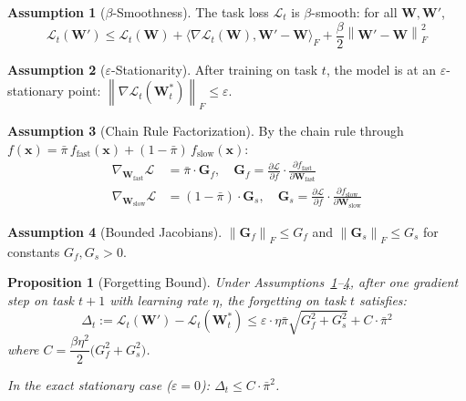 \documentclass[11pt,a4paper]{article}
\theoremstyle{plain}
\newtheorem{proposition}{Proposition}
\theoremstyle{definition}
\newtheorem{assumption}{Assumption}
\theoremstyle{remark}
\newcommand{\norm}[1]{\left\lVert #1 \right\rVert}
\newcommand{\inner}[2]{\langle #1, #2 \rangle}
\newcommand{\pibar}{\bar{\pi}}
\begin{document}
\begin{assumption}[$\beta$-Smoothness]
\label{ass:smooth}
The task loss $\mathcal{L}_t$ is $\beta$-smooth: for all $\mathbf{W}, \mathbf{W}'$,
\[
  \mathcal{L}_t(\mathbf{W}') \leq \mathcal{L}_t(\mathbf{W}) + \inner{\nabla\mathcal{L}_t(\mathbf{W})}{\mathbf{W}'-\mathbf{W}}_F + \frac{\beta}{2}\norm{\mathbf{W}'-\mathbf{W}}_F^2
\]
\end{assumption}

\begin{assumption}[$\varepsilon$-Stationarity]
\label{ass:stat}
After training on task $t$, the model is at an $\varepsilon$-stationary point:
$\norm{\nabla\mathcal{L}_t(\mathbf{W}_t^*)}_F \leq \varepsilon$.
\end{assumption}

\begin{assumption}[Chain Rule Factorization]
\label{ass:chain}
By the chain rule through $f(\mathbf{x}) = \pibar\,f_\text{fast}(\mathbf{x}) + (1-\pibar)\,f_\text{slow}(\mathbf{x})$:
\begin{align}
  \nabla_{\mathbf{W}_\text{fast}}\mathcal{L} &= \pibar \cdot \mathbf{G}_f, \quad \mathbf{G}_f = \frac{\partial\mathcal{L}}{\partial f}\cdot\frac{\partial f_\text{fast}}{\partial\mathbf{W}_\text{fast}} \\
  \nabla_{\mathbf{W}_\text{slow}}\mathcal{L} &= (1-\pibar) \cdot \mathbf{G}_s, \quad \mathbf{G}_s = \frac{\partial\mathcal{L}}{\partial f}\cdot\frac{\partial f_\text{slow}}{\partial\mathbf{W}_\text{slow}}
\end{align}
\end{assumption}

\begin{assumption}[Bounded Jacobians]
\label{ass:bound}
$\norm{\mathbf{G}_f}_F \leq G_f$ and $\norm{\mathbf{G}_s}_F \leq G_s$ for constants $G_f, G_s > 0$.
\end{assumption}

\begin{proposition}[Forgetting Bound]
\label{prop:forget}
Under Assumptions~\ref{ass:smooth}--\ref{ass:bound}, after one gradient step on task $t+1$ with learning rate $\eta$, the forgetting on task $t$ satisfies:
\[
  \Delta_t := \mathcal{L}_t(\mathbf{W}') - \mathcal{L}_t(\mathbf{W}_t^*) \leq \varepsilon \cdot \eta \pibar \sqrt{G_f^2 + G_s^2} + C \cdot \pibar^2
\]
where $C = \dfrac{\beta\eta^2}{2}\bigl(G_f^2 + G_s^2\bigr)$.

In the exact stationary case ($\varepsilon = 0$): $\Delta_t \leq C \cdot \pibar^2$.
\end{proposition}
\end{document}
